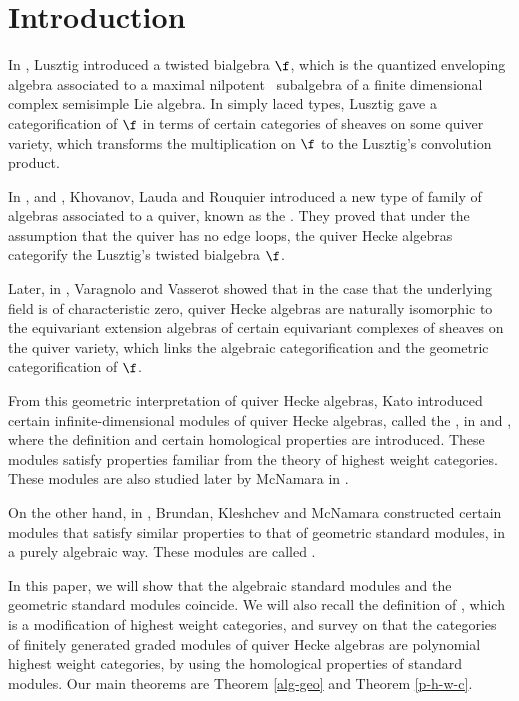 
\section{Introduction}

In \cite{L}, Lusztig introduced a twisted bialgebra $\f$, which is 
the quantized enveloping algebra associated to a maximal nilpotent 
\
subalgebra of a finite dimensional complex semisimple Lie algebra.
In simply laced types, Lusztig gave a categorification of $\f$ in terms of certain
categories of sheaves on some quiver variety, which transforms
the multiplication on $\f$ to the Lusztig's convolution product.

In \cite{KL1}, \cite{KL2} and \cite{R}, Khovanov, Lauda and Rouquier
introduced a new type of family of algebras associated to a quiver,
known as the \term{quiver Hecke algebras}. They proved that under the assumption
that the quiver has no edge loops, the quiver Hecke algebras
categorify the Lusztig's twisted bialgebra $\f$.

Later, in \cite{VV}, Varagnolo and Vasserot showed that 
in the case that the underlying field is of characteristic zero,
quiver Hecke algebras are naturally isomorphic to the equivariant 
extension algebras of certain equivariant complexes of sheaves
on the quiver variety, which links the algebraic categorification
and the geometric categorification of $\f$.

From this geometric interpretation of quiver Hecke algebras,
Kato introduced certain infinite-dimensional modules of quiver Hecke algebras,
called the \term{geometric standard modules}, in \cite{K} and \cite{K2},
where the definition and certain homological properties are introduced.
These modules satisfy properties familiar from the theory of
highest weight categories. 
These modules are also studied later by McNamara in \cite{Mc2}.

On the other hand, in \cite{BKM}, Brundan, Kleshchev and McNamara constructed
certain modules that satisfy similar properties to that of 
geometric standard modules, in a purely algebraic way.
These modules are called .

In this paper, we will show that the algebraic standard modules
and the geometric standard modules coincide. We will also
recall the definition of ,
which is a modification of highest weight categories, and survey on that
the categories of finitely generated graded modules of quiver Hecke algebras
are polynomial highest weight categories, by using the 
homological properties of standard modules. Our main theorems 
are Theorem \ref{alg-geo} and Theorem \ref{p-h-w-c}.

